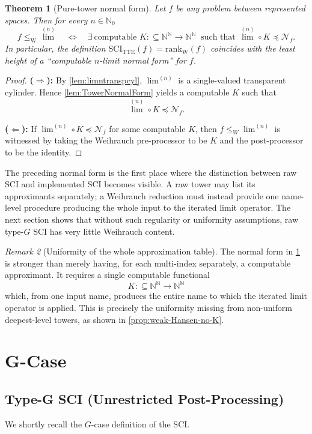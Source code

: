 \documentclass{lmcs} %
\theoremstyle{plain}
\theoremstyle{plain}
\newtheorem{theorem}{Theorem}[section]
\theoremstyle{definition}
\theoremstyle{remark}
\newtheorem{remark}[theorem]{Remark}
\theoremstyle{definition}
\theoremstyle{remark}
\numberwithin{equation}{section}
\newcommand{\N}{\mathbb{N}}
\newcommand{\Baire}{\N^\N}
\newcommand{\Lim}{\operatorname{lim}}
\newcommand{\Limi}[1]{\Lim^{(#1)}}
\begin{document}
\begin{theorem}[Pure-tower normal form]\label{thm:pure-tower-normal-form}
Let $f$ be any problem between represented spaces. Then for every $n\in\N_0$
\[
f\le_{\mathrm W}\Limi{n}
\quad\Longleftrightarrow\quad
\exists\ \text{computable }K:\subseteq\Baire\to\Baire\ \text{ such that } \Limi{n} \circ K \preceq \mathcal N_f.
\]
In particular, the definition $\mathrm{SCI}_{\mathrm{TTE}}(f)=\mathrm{rank}_{\mathrm W}(f)$ coincides with the least height of a \enquote{computable $n$-limit normal form} for $f$.
\end{theorem}
\begin{proof}
\textbf{($\Rightarrow$):} By \cref{lem:limntranspcyl}, $\Limi{n}$ is a single-valued
transparent cylinder. Hence \cref{lem:TowerNormalForm} yields a computable $K$ such that
\[
\Limi{n} \circ K \preceq \mathcal N_f .
\]

\textbf{($\Leftarrow$):} If $\Limi{n} \circ K \preceq \mathcal N_f$ for some computable $K$, then
$f \leq_W \Limi{n}$ is witnessed by taking the Weihrauch pre-processor to be $K$
and the post-processor to be the identity.
\end{proof}

The preceding normal form is the first place where the distinction between raw SCI and
implemented SCI becomes visible. A raw tower may list its approximants separately; a
Weihrauch reduction must instead provide one name-level procedure producing the whole
input to the iterated limit operator. The next section shows that without such regularity
or uniformity assumptions, raw type-\(G\) SCI has very little Weihrauch content.

\begin{remark}[Uniformity of the whole approximation table]
The normal form in \cref{thm:pure-tower-normal-form} is stronger than merely
having, for each multi-index separately, a computable approximant. It requires a single
computable functional
\[
        K:\subseteq\mathbb N^{\mathbb N}\to\mathbb N^{\mathbb N}
\]
which, from one input name, produces the entire name to which the iterated limit
operator is applied. This is precisely the uniformity missing from non-uniform
deepest-level towers, as shown in \cref{prop:weak-Hansen-no-K}.
\end{remark}

\section{G-Case}{\label{sec:G-Case}}
\subsection{Type-G SCI (Unrestricted Post-Processing)}
We shortly recall the $G$-case definition of the SCI.
\end{document}
